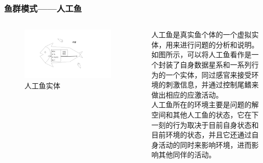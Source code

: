 \begin{frame}
	\frametitle{鱼群模式——人工鱼}
	\begin{columns}
		\begin{figure}
			\centering
			\includegraphics[width=0.9\textwidth]{pic/fish2.pdf}
			\caption{人工鱼实体}
		\end{figure}
		人工鱼是真实鱼个体的一个虚拟实体，用来进行问题的分析和说明。\\如图所示，可以将人工鱼看作是一个封装了自身数据星系和一系列行为的一个实体，同过感官来接受环境的刺激信息，并通过控制尾鳍来做出相应的应激活动。\\人工鱼所在的环境主要是问题的解空间和其他人工鱼的状态，它在下一刻的行为取决于目前自身状态和目前环境的状态，并且它还通过自身活动的同时来影响环境，进而影响其他同伴的活动。
	\end{columns}
		
\end{frame}


